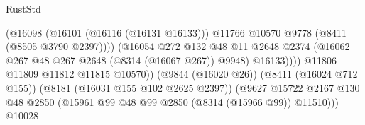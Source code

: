 \begin{lexlean}{RustStd}
\begin{coremodule}
                                                        (@16098
                                                          (@16101 (@16116 (@16131 @16133)))
                                                          @11766
                                                          @10570
                                                          @9778
                                                          (@8411 (@8505 @3790 @2397))))
                                                      (@16054
                                                        @272
                                                        @132
                                                        @48
                                                        @11
                                                        @2648
                                                        @2374
                                                        (@16062
                                                          @267
                                                          @48
                                                          @267
                                                          @2648
                                                          (@8314 (@16067 @267))
                                                          @9948)
                                                        @16133))))
                                                @11806
                                                @11809
                                                @11812
                                                @11815
                                                @10570))
                                            (@9844 (@16020 @26))
                                            (@8411 (@16024 @712 @155))
                                            (@8181 (@16031 @155 @102 @2625 @2397))
                                            (@9627
                                              @15722
                                              @2167
                                              @130
                                              @48
                                              @2850
                                              (@15961
                                                @99
                                                @48
                                                @99
                                                @2850
                                                (@8314 (@15966 @99))
                                                @11510)))
                                          @10028

\end{coremodule}
\end{lexlean}
